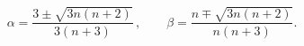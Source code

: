 \begin{equation} \alpha = {\frac{3 \pm
	    \sqrt{3n(n+2)}}{3(n+3)}}\, , \qquad \beta = {\frac{n \mp
	    \sqrt{3n(n+2)}}{n(n+3)}}.  \end{equation} 
